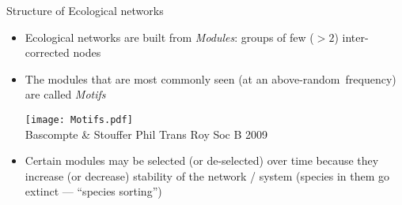 \begin{frame}{Structure of Ecological networks}

  \begin{itemize}[<+->]
    \item Ecological networks are built from {\it Modules}\footnotemark[1]: groups of few ($>2$) inter-corrected nodes 
    \item The modules that are most commonly seen (at an above-random\footnotemark[2]~frequency) are called {\it Motifs}  
  
    \begin{center}    
      \texttt{[image: Motifs.pdf]}\\
      {\tiny Bascompte \& Stouffer Phil Trans Roy Soc B 2009}
    \end{center}
  
    \item Certain modules may be selected (or de-selected) over time because they increase (or decrease) stability of the network / system (species in them go extinct --- ``species sorting'')
  
  \end{itemize} 
  
  
  
\end{frame}
  
